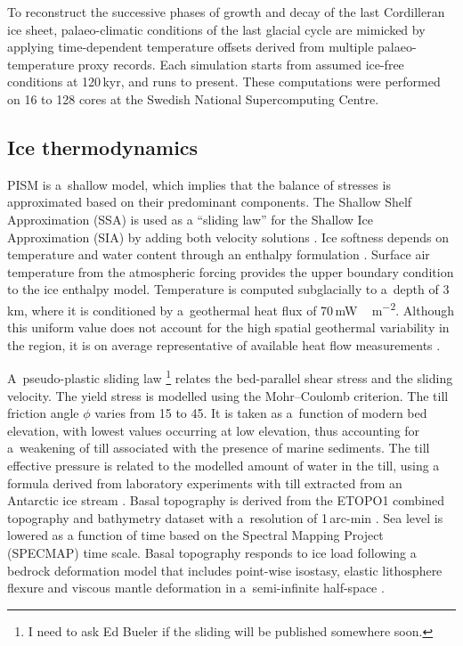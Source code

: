 \documentclass[tc, manuscript]{copernicus}
\begin{document}
To reconstruct the successive phases of growth and decay of the last Cordilleran
ice sheet, palaeo-climatic conditions of the last glacial cycle are mimicked
by applying time-dependent temperature offsets derived from multiple
palaeo-temperature proxy records. Each simulation starts from assumed ice-free
conditions at 120\,kyr, and runs to present. These computations were
performed on 16 to 128 cores at the Swedish National Supercomputing Centre.

\subsection{Ice thermodynamics}

PISM is a~shallow model, which implies that the balance of stresses is
approximated based on their predominant components.
The Shallow Shelf Approximation (SSA) is used as a ``sliding law'' for the
Shallow Ice Approximation (SIA) by adding both velocity solutions
\citep[Eqn.~15]{Winkelmann.etal.2011}.
Ice softness depends on temperature and water content through an enthalpy
formulation \citep{Aschwanden.etal.2012}. Surface air
temperature from the atmospheric forcing provides the upper boundary condition
to the ice enthalpy model. Temperature is computed subglacially to a~depth of
3\,km, where it is conditioned by a~geothermal heat flux of
70\,\unit{mW\,m^{-2}}. Although this uniform value does not
account for the high spatial geothermal variability in the region, it is on
average representative of available heat flow measurements
\citep{Blackwell.Richards.2004}.

A~pseudo-plastic sliding law \citep{PISM-authors.2014}\footnote{I need to ask
    Ed Bueler if the sliding will be published somewhere soon.} relates the
bed-parallel shear stress and the sliding velocity. The yield stress is
modelled using the Mohr--Coulomb criterion. The till friction angle $\phi$
varies from 15 to 45{\degree}. It is taken as a~function of modern bed
elevation, with lowest values occurring at low elevation, thus accounting
for a~weakening of till associated with the presence of marine sediments.
The till effective pressure is related to the modelled amount of water in the
till, using a formula derived from laboratory experiments with till extracted
from an Antarctic ice stream \citep[Eqn.~2]{Tulaczyk.etal.2000}. Basal
topography is
derived from the ETOPO1 combined topography and bathymetry dataset with
a~resolution of 1\,arc-min \citep{Amante.Eakins.2009}. Sea level is lowered as
a function of time based on the Spectral Mapping Project (SPECMAP)
\citep[SPECMAP,][]{Imbrie.etal.1989} time scale.
Basal topography responds to ice load
following a bedrock deformation model that includes point-wise isostasy,
elastic lithosphere flexure and viscous mantle deformation in a~semi-infinite
half-space \citep{Lingle.Clark.1985,Bueler.etal.2007}.
\end{document}
